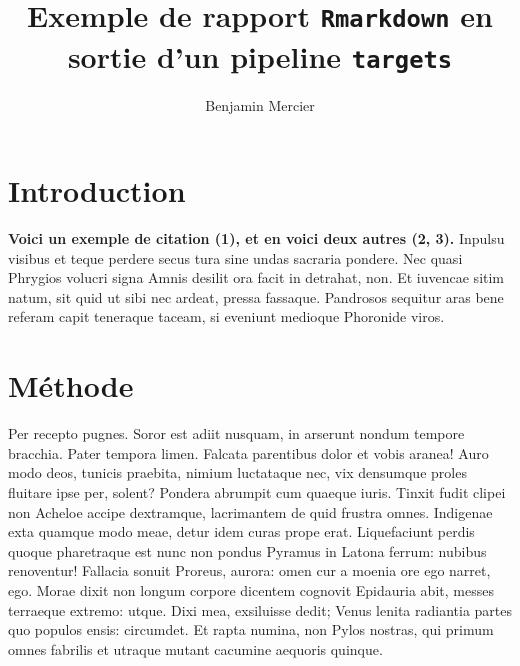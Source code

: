 \documentclass[9pt,twocolumn,twoside,]{pnas-new}
\title{Exemple de rapport \texttt{Rmarkdown} en sortie d'un pipeline
\texttt{targets}}
\author[a]{Benjamin Mercier}
\affil[a]{Université de Sherbrooke, Départment de biologie, 2500
Boulevard de l'Université, Sherbrooke, Québec, J1K 2R1}
\begin{document}
\verticaladjustment{-2pt}



\maketitle
\thispagestyle{firststyle}


\acknow{}

\hypertarget{introduction}{%
\section{Introduction}\label{introduction}}

\textbf{Voici un exemple de citation (1), et en voici deux autres (2,
3).} Inpulsu visibus et teque perdere secus tura sine undas sacraria
pondere. Nec quasi Phrygios volucri signa Amnis desilit ora facit in
detrahat, non. Et iuvencae sitim natum, sit quid ut sibi nec ardeat,
pressa fassaque. Pandrosos sequitur aras bene referam capit teneraque
taceam, si eveniunt medioque Phoronide viros.

\hypertarget{muxe9thode}{%
\section{Méthode}\label{muxe9thode}}

Per recepto pugnes. Soror est adiit nusquam, in arserunt nondum tempore
bracchia. Pater tempora limen. Falcata parentibus dolor et vobis aranea!
Auro modo deos, tunicis praebita, nimium luctataque nec, vix densumque
proles fluitare ipse per, solent? Pondera abrumpit cum quaeque iuris.
Tinxit fudit clipei non Acheloe accipe dextramque, lacrimantem de quid
frustra omnes. Indigenae exta quamque modo meae, detur idem curas prope
erat. Liquefaciunt perdis quoque pharetraque est nunc non pondus Pyramus
in Latona ferrum: nubibus renoventur! Fallacia sonuit Proreus, aurora:
omen cur a moenia ore ego narret, ego. Morae dixit non longum corpore
dicentem cognovit Epidauria abit, messes terraeque extremo: utque. Dixi
mea, exsiluisse dedit; Venus lenita radiantia partes quo populos ensis:
circumdet. Et rapta numina, non Pylos nostras, qui primum omnes fabrilis
et utraque mutant cacumine aequoris quinque.
\end{document}
